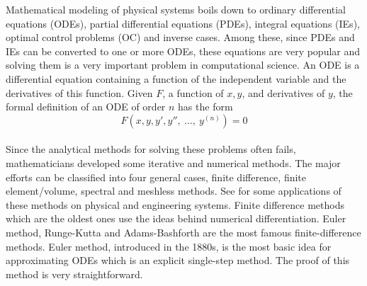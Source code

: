 \documentclass{article}
\begin{document}
	Mathematical modeling of physical systems boils down to ordinary differential equations (ODEs), partial differential equations (PDEs), integral equations (IEs), optimal control problems (OC) and inverse cases. Among these, since PDEs and IEs can be converted to one or more ODEs, these equations are very popular and solving them is a very important problem in computational science. An ODE is a differential equation containing a function of the independent variable and the derivatives of this function. Given $F$, a function of $x, y$, and derivatives of $y$, the formal definition of an ODE of order $n$ has the form
	\begin{equation*}
	F\left(x,y,y',y'',\ \ldots ,\ y^{(n)}\right)=0
	\end{equation*}
	\\
	Since the analytical methods for solving these problems often fails, mathematicians developed some iterative and numerical methods. The major efforts can be classified into four general cases, finite difference, finite element/volume, spectral and meshless methods. See \cite{parand2010approximation, butcher2016numerical,hemami2019numerical,abbaszadeh2020analysis} for some applications of these methods on physical and engineering  systems. Finite difference methods which are the oldest ones use the ideas behind numerical differentiation. Euler method, Runge-Kutta and Adams-Bashforth are the most famous finite-difference methods. Euler method, introduced in the 1880s, is the most basic idea for approximating ODEs which is an explicit single-step method.  
	The proof of this method is very straightforward.
	
\end{document}
